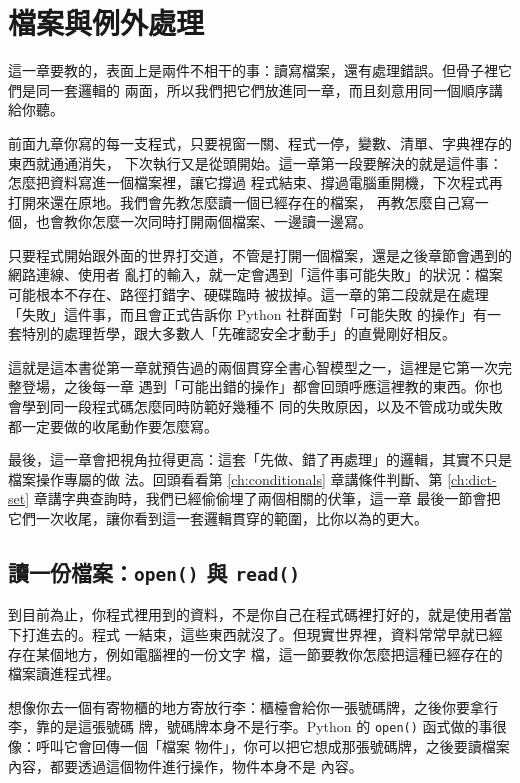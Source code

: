 \chapter{檔案與例外處理}
\label{ch:files-exceptions}

這一章要教的，表面上是兩件不相干的事：讀寫檔案，還有處理錯誤。但骨子裡它們是同一套邏輯的
兩面，所以我們把它們放進同一章，而且刻意用同一個順序講給你聽。

前面九章你寫的每一支程式，只要視窗一關、程式一停，變數、清單、字典裡存的東西就通通消失，
下次執行又是從頭開始。這一章第一段要解決的就是這件事：怎麼把資料寫進一個檔案裡，讓它撐過
程式結束、撐過電腦重開機，下次程式再打開來還在原地。我們會先教怎麼讀一個已經存在的檔案，
再教怎麼自己寫一個，也會教你怎麼一次同時打開兩個檔案、一邊讀一邊寫。

只要程式開始跟外面的世界打交道，不管是打開一個檔案，還是之後章節會遇到的網路連線、使用者
亂打的輸入，就一定會遇到「這件事可能失敗」的狀況：檔案可能根本不存在、路徑打錯字、硬碟臨時
被拔掉。這一章的第二段就是在處理「失敗」這件事，而且會正式告訴你 Python 社群面對「可能失敗
的操作」有一套特別的處理哲學，跟大多數人「先確認安全才動手」的直覺剛好相反。

這就是這本書從第一章就預告過的兩個貫穿全書心智模型之一，這裡是它第一次完整登場，之後每一章
遇到「可能出錯的操作」都會回頭呼應這裡教的東西。你也會學到同一段程式碼怎麼同時防範好幾種不
同的失敗原因，以及不管成功或失敗都一定要做的收尾動作要怎麼寫。

最後，這一章會把視角拉得更高：這套「先做、錯了再處理」的邏輯，其實不只是檔案操作專屬的做
法。回頭看看第 \ref{ch:conditionals} 章講條件判斷、第 \ref{ch:dict-set} 章講字典查詢時，我們已經偷偷埋了兩個相關的伏筆，這一章
最後一節會把它們一次收尾，讓你看到這一套邏輯貫穿的範圍，比你以為的更大。

\section{讀一份檔案：\texttt{open()} 與 \texttt{read()}}
\label{sec:reading-files}

到目前為止，你程式裡用到的資料，不是你自己在程式碼裡打好的，就是使用者當下打進去的。程式
一結束，這些東西就沒了。但現實世界裡，資料常常早就已經存在某個地方，例如電腦裡的一份文字
檔，這一節要教你怎麼把這種已經存在的檔案讀進程式裡。

想像你去一個有寄物櫃的地方寄放行李：櫃檯會給你一張號碼牌，之後你要拿行李，靠的是這張號碼
牌，號碼牌本身不是行李。Python 的 \texttt{open()} 函式做的事很像：呼叫它會回傳一個「檔案
物件」，你可以把它想成那張號碼牌，之後要讀檔案內容，都要透過這個物件進行操作，物件本身不是
內容。

